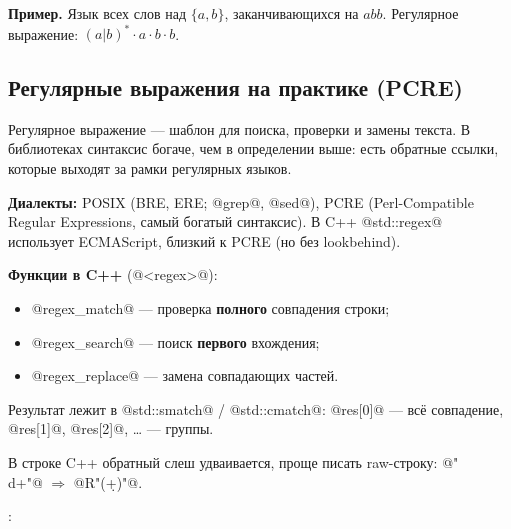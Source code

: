 \documentclass[11pt,a4paper]{article}
\begin{document}
\textbf{Пример.} Язык всех слов над $\{a,b\}$, заканчивающихся на $abb$. Регулярное выражение: $(a|b)^*\cdot a\cdot b\cdot b$.

\subsection{Регулярные выражения на практике (PCRE)}

Регулярное выражение — шаблон для поиска, проверки и замены текста. В библиотеках синтаксис богаче, чем в определении выше:
есть обратные ссылки, которые выходят за рамки регулярных языков.

\textbf{Диалекты:} POSIX (BRE, ERE; @grep@, @sed@), PCRE (Perl-Compatible Regular Expressions, самый богатый синтаксис).
В C++ @std::regex@ использует ECMAScript, близкий к PCRE (но без lookbehind).

\textbf{Функции в C++} (@<regex>@):
\begin{itemize}
\item @regex_match@ — проверка \textbf{полного} совпадения строки;
\item @regex_search@ — поиск \textbf{первого} вхождения;
\item @regex_replace@ — замена совпадающих частей.
\end{itemize}
Результат лежит в @std::smatch@ / @std::cmatch@: @res[0]@ — всё совпадение, @res[1]@, @res[2]@, \ldots{} — группы.

\begin{zam}
В строке C++ обратный слеш удваивается, проще писать raw-строку: @"\\d+"@ $\Rightarrow$ @R"(\d+)"@.
\end{zam}


\begin{opr}
:
\end{opr}
\end{document}
